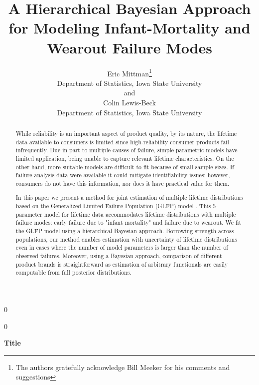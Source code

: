 \documentclass[12pt]{article}
\newcommand{\blind}{0}
\begin{document}
\def\spacingset#1{\renewcommand{\baselinestretch}%
{#1}\small\normalsize} \spacingset{1}



\blind
{
  \title{\bf A Hierarchical Bayesian Approach for Modeling Infant-Mortality and Wearout Failure Modes}
  \author{Eric Mittman\thanks{
    The authors gratefully acknowledge Bill Meeker for his comments and suggestions}\hspace{.2cm}\\
    Department of Statistics, Iowa State University\\
    and \\
    Colin Lewis-Beck \\
    Department of Statistics, Iowa State University}
  \maketitle
} \fi

\blind
{
  \bigskip
  \bigskip
  \bigskip
  \begin{center}
    {\LARGE\bf Title}
\end{center}
  \medskip
} \fi

\bigskip
\begin{abstract}
While reliability is an important aspect of product quality, by its nature, the lifetime data available to consumers is limited since high-reliability consumer products fail infrequently. Due in part to multiple causes of failure, simple parametric models have limited application, being unable to capture relevant lifetime characteristics. On the other hand, more suitable models are difficult to fit because of small sample sizes. If failure analysis data were available it could mitigate identifiability issues; however, consumers do not have this information, nor does it have practical value for them.

In this paper we present a method for joint estimation of multiple lifetime distributions based on the Generalized Limited Failure Population (GLFP) model \citep{chan}. This 5-parameter model for lifetime data accommodates lifetime distributions with multiple failure modes:  early failure due to "infant mortality" and failure due to wearout. We fit the GLFP model using a hierarchical Bayesian approach.  Borrowing strength across populations, our method enables estimation with uncertainty of lifetime distributions even in cases where the number of model parameters is larger than the number of observed failures.  Moreover, using a Bayesian approach, comparison of different product brands is straightforward as estimation of arbitrary functionals are easily computable from full posterior distributions.
\end{abstract}
\end{document}
